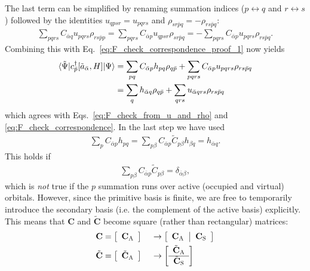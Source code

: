 \documentclass[aip,jcp,preprint,superscriptaddress,nofootinbib]{revtex4-1}
\begin{document}
The last term can be simplified by renaming summation indices ($p \leftrightarrow q$ and $r \leftrightarrow s$)
followed by the identities $u_{qpsr} = u_{pqrs}$ and
$\rho_{sr\bar{p}q} = -\rho_{rs\bar{p}q}$:
\begin{align}
       \sum_{pqrs} C_{\bar{\alpha} q} u_{pqrs} \rho_{rs \bar{p} p} 
    =  \sum_{pqrs} C_{\bar{\alpha} p} u_{qpsr} \rho_{sr \bar{p} q}
    = -\sum_{pqrs} C_{\bar{\alpha} p} u_{pqrs} \rho_{rs \bar{p} q}.
\end{align}
Combining this with Eq.~\eqref{eq:F_check_correspondence_proof_1} now yields
\begin{align}
    \langle \tilde{\Psi} \vert  c^{\dagger}_{\bar{p}} [\tilde{a}_{\bar{\alpha}}, H]  \vert \Psi \rangle 
    &= \sum_{pq}   C_{\bar{\alpha} p} h_{pq}   \rho_{q \bar{p}}
    +  \sum_{pqrs} C_{\bar{\alpha} p} u_{pqrs} \rho_{rs \bar{p} q}  \nonumber\\
    &= \sum_{q}    h_{\bar{\alpha} q}   \rho_{q \bar{p}}
    +  \sum_{qrs}  u_{\bar{\alpha} qrs} \rho_{rs \bar{p} q}
    \label{eq:F_check_correspondence_proof_2}
\end{align}
which agrees with Eqs.~\eqref{eq:F_check_from_u_and_rho} and \eqref{eq:F_check_correspondence}.
In the last step we have used
\begin{align}
    \sum_{p}  C_{\bar{\alpha} p} h_{pq} 
    = \sum_{p \beta} C_{\bar{\alpha} p} \tilde{C}_{p \beta} h_{\beta q}
    = h_{\bar{\alpha} q}.
\end{align}
This holds if
\begin{align} \label{eq:C_C_tilde_inverse}
    \sum_{p \beta} C_{\bar{\alpha} p} \tilde{C}_{p \beta} = \delta_{\bar{\alpha} \beta},
\end{align}
which is \textit{not} true if the $p$ summation runs over active (occupied and virtual) orbitals. However,
since the primitive basis is finite,
we are free to temporarily introduce the secondary basis (i.e. the complement of the active basis) explicitly.
This means that $\mathbf{C}$ and $\tilde{\mathbf{C}}$ become square (rather than rectangular) matrices:
\begin{alignat}{2}
    \mathbf{C} 
    &= 
    \left[
	\begin{array}{c}
        \mathbf{C}_{\textsc{A}}
	\end{array} \right]
    {} &&\rightarrow
    \left[
	\begin{array}{c | c}
        \mathbf{C}_{\textsc{A}} {\,} & {\,} \mathbf{C}_{\textsc{S}} 
	\end{array} \right] \\
    \tilde{\mathbf{C}} 
    &= 
    \left[
	\begin{array}{c}
        \tilde{\mathbf{C}}_{\textsc{A}}
	\end{array} \right]
    {} &&\rightarrow
    \left[
	\begin{array}{c}
        \tilde{\mathbf{C}}_{\textsc{A}} \\
        \hline
        \tilde{\mathbf{C}}_{\textsc{S}} 
	\end{array} \right]
\end{alignat}
\end{document}
